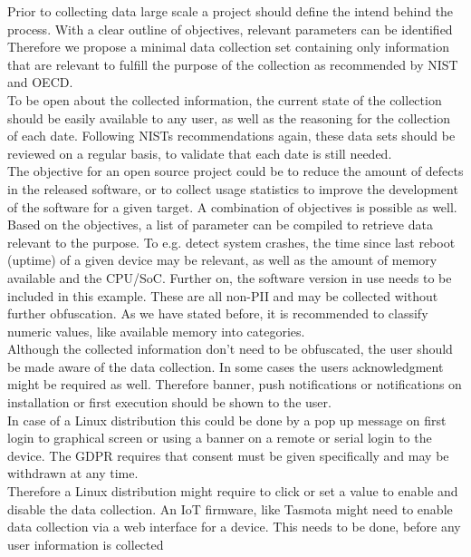         Prior to collecting data large scale a project should define the intend behind the process. With a clear outline of objectives, relevant parameters can be identified 
        Therefore we propose a minimal data collection set containing only information that are relevant to fulfill the purpose of the collection as recommended by NIST and OECD.\\
        To be open about the collected information, the current state of the collection should be easily available to any user, as well as the reasoning for the collection of each date.
        Following NISTs recommendations again, these data sets should be reviewed on a regular basis, to validate that each date is still needed.\\
        
        The objective for an open source project could be to reduce the amount of defects in the released software, or  to collect usage statistics to improve the development of the software for a given target. A combination of objectives is possible as well.\\
        Based on the objectives, a list of parameter can be compiled to retrieve data relevant to the purpose.
        To e.g. detect system crashes, the time since last reboot (uptime) of a given device may be relevant, as well as the amount of memory available and the CPU/SoC. Further on, the software version in use needs to be included in this example. These are all non-PII and may be collected without further obfuscation. As we have stated before, it is recommended to 
        classify numeric values, like available memory into categories.\\
        
        Although the collected information don't need to be obfuscated, the user should be made aware of the data collection. In some cases the users acknowledgment might be required as well. Therefore banner, push notifications or notifications on installation or first execution should be shown to the user. \\
        In case of a Linux distribution this could be done by a pop up message on first login to graphical screen or using a banner on a remote or serial login to the device.
        The GDPR requires that consent must be given specifically and may be withdrawn at any time\cite{noauthor_gdpr_2020}.\\ 
        Therefore a Linux distribution might require to click or set a value to enable and disable the data collection. An IoT firmware, like Tasmota might need to enable data collection via a web interface for a device. This needs to be done, before any user information is collected\\ 
        

